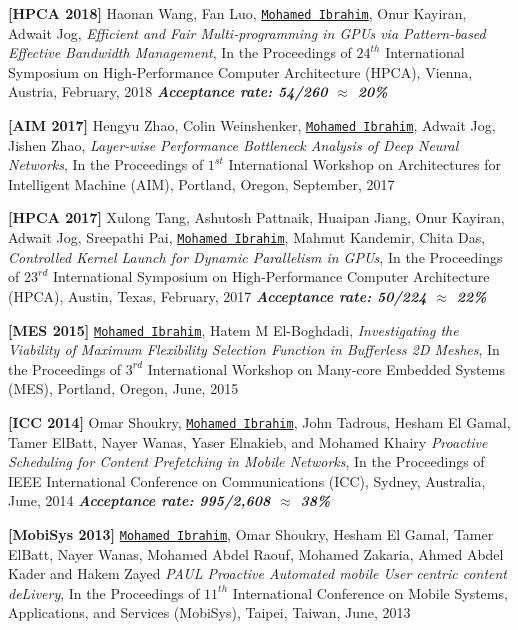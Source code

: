 \documentclass[10pt,a4]{article}
\begin{document}

\begin{description}
\item 
{\bf [HPCA 2018]}
Haonan Wang, Fan Luo, {\tt \underline{Mohamed Ibrahim}}, Onur Kayiran, Adwait Jog, 
{\it Efficient and Fair Multi-programming in GPUs via Pattern-based Effective Bandwidth Management},
In the Proceedings of $24^{th}$ International Symposium on High-Performance Computer Architecture (HPCA), 
Vienna, Austria, February, 2018
\textbf{\textit{Acceptance rate: 54/260 $\approx$ 20\%}}

\item 
{\bf [AIM 2017]}
Hengyu Zhao, Colin Weinshenker, {\tt \underline{Mohamed Ibrahim}}, Adwait Jog, Jishen Zhao,
{\it Layer-wise Performance Bottleneck Analysis of Deep Neural Networks},
In the Proceedings of $1^{st}$ International Workshop on Architectures for Intelligent Machine (AIM), Portland, Oregon, September, 2017

\item 
{\bf [HPCA 2017]}
Xulong Tang, Ashutosh Pattnaik, Huaipan Jiang, Onur Kayiran, Adwait Jog, Sreepathi Pai, {\tt \underline{Mohamed Ibrahim}}, Mahmut Kandemir, Chita Das, 
{\it Controlled Kernel Launch for Dynamic Parallelism in GPUs},
In the Proceedings of $23^{rd}$ International Symposium on High-Performance Computer Architecture (HPCA), 
Austin, Texas, February, 2017
\textbf{\textit{Acceptance rate: 50/224 $\approx$ 22\%}}


\item 
{\bf [MES 2015]}
{\tt \underline{Mohamed Ibrahim}}, Hatem M El-Boghdadi,
{\it Investigating the Viability of Maximum Flexibility Selection Function in Bufferless 2D Meshes},
In the Proceedings of $3^{rd}$ International Workshop on Many-core Embedded Systems (MES), Portland, Oregon, June, 2015

\item{\bf [ICC 2014]} 
Omar Shoukry, {\tt \underline{Mohamed Ibrahim}}, John Tadrous, Hesham El Gamal, Tamer ElBatt, Nayer Wanas, Yaser Elnakieb, and Mohamed Khairy 
{\it Proactive Scheduling for Content Pre­fetching in Mobile Networks}, 
In the Proceedings of IEEE International Conference on Communications (ICC), Sydney, Australia, June, 2014
\textbf{\textit{Acceptance rate: 995/2,608 $\approx$ 38\%}} 

\item{\bf [MobiSys 2013]} 
{\tt \underline{Mohamed Ibrahim}}, Omar Shoukry, Hesham El Gamal, Tamer ElBatt, Nayer Wanas, Mohamed Abdel Raouf, Mohamed Zakaria, Ahmed Abdel Kader and Hakem Zayed 
{\it PAUL­ Proactive Automated mobile User centric content deLivery}, 
In the Proceedings of $11^{th}$ International Conference on Mobile Systems, Applications, and Services (MobiSys), Taipei, Taiwan, June, 2013

\end{description}
\end{document}

